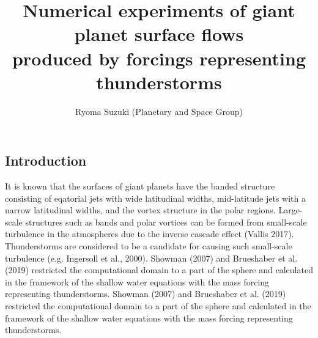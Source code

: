 \documentclass[a4j,multicol,8pt]{jarticle}
\begin{document}
\pagestyle{empty} 
\title{\Large Numerical experiments of giant planet surface flows  \\
produced by forcings representing thunderstorms
}

\author{\large Ryoma Suzuki (Planetary and Space Group)}
\date{}
\maketitle
\begin{multicols}{2}
\vspace{-0.2zh}
\section{Introduction}
\vspace{-0.8zh}
%
It is known that the surfaces of giant planets have
the banded structure consisting of eqatorial jets with wide latitudinal widths,
mid-latitude jets with a narrow latitudinal widths, and
the vortex structure in the polar regions.
Large-scale structures such as bands and polar vortices
can be formed from small-scale turbulence in the atmospheres
due to the inverse cascade effect (Vallis 2017).
Thunderstorms are considered to be
a candidate for causing such small-scale turbulence (e.g. Ingersoll et al., 2000).
%
%
Showman (2007) and Brueshaber et al. (2019) restricted the
computational domain to a part of the sphere and
calculated in the framework of the shallow water equations
with the mass forcing representing thunderstorms.
%
%
%
Showman (2007) and Brueshaber et al. (2019) restricted the
computational domain to a part of the sphere and
calculated in the framework of the shallow water equations
with the mass forcing representing thunderstorms.

\end{multicols}
\end{document}
